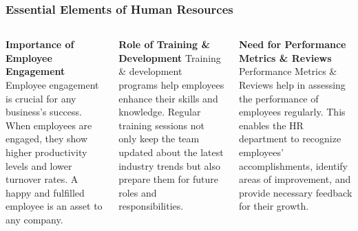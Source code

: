 \documentclass[5pt]{beamer}
\begin{document}
\begin{frame}
\frametitle{Essential Elements of Human Resources}
\begin{columns}
\begin{column}{0.3\textwidth}
\begin{block}{\textbf{Importance of Employee Engagement}}
Employee engagement is crucial for any business's success. When employees are engaged, they show higher productivity levels and lower turnover rates. A happy and fulfilled employee is an asset to any company.
\end{block}
\end{column}
\begin{column}{0.3\textwidth}
\begin{block}{\textbf{Role of Training \& Development}}
Training \& development programs help employees enhance their skills and knowledge. Regular training sessions not only keep the team updated about the latest industry trends but also prepare them for future roles and responsibilities.
\end{block}
\end{column}
\begin{column}{0.3\textwidth}
\begin{block}{\textbf{Need for Performance Metrics \& Reviews}}
Performance Metrics \& Reviews help in assessing the performance of employees regularly. This enables the HR department to recognize employees' accomplishments, identify areas of improvement, and provide necessary feedback for their growth.
\end{block}
\end{column}
\end{columns}
\end{frame}
\end{document}
